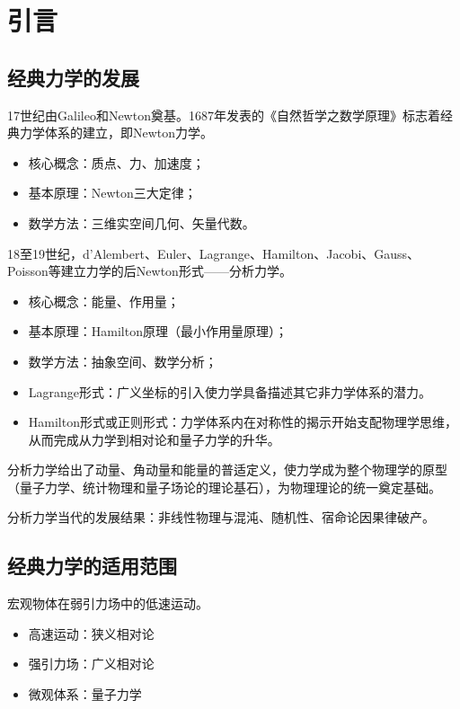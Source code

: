 
\setcounter{chapter}{-1}
\chapter{引言}

\section{经典力学的发展}

17世纪由Galileo和Newton奠基。1687年发表的《自然哲学之数学原理》标志着经典力学体系的建立，即Newton力学。
\begin{itemize}
    \item {\heiti 核心概念}：质点、力、加速度；
    \item {\heiti 基本原理}：Newton三大定律；
    \item {\heiti 数学方法}：三维实空间几何、矢量代数。
\end{itemize}

18至19世纪，d'Alembert、Euler、Lagrange、Hamilton、Jacobi、Gauss、Poisson等建立力学的后Newton形式——分析力学。
\begin{itemize}
    \item {\heiti 核心概念}：能量、作用量；
    \item {\heiti 基本原理}：Hamilton原理（最小作用量原理）；
    \item {\heiti 数学方法}：抽象空间、数学分析；
    \item {\heiti Lagrange形式}：广义坐标的引入使力学具备描述其它非力学体系的潜力。
    \item {\heiti Hamilton形式或正则形式}：力学体系内在对称性的揭示开始支配物理学思维，从而完成从力学到相对论和量子力学的升华。
\end{itemize}

分析力学给出了动量、角动量和能量的普适定义，使力学成为整个物理学的原型（量子力学、统计物理和量子场论的理论基石），为物理理论的统一奠定基础。

分析力学当代的发展结果：非线性物理与混沌、随机性、宿命论因果律破产。

\section{经典力学的适用范围}

{\heiti 宏观物体}在{\heiti 弱引力场}中的{\heiti 低速}运动。

\begin{itemize}
    \item {\heiti 高速运动}：狭义相对论
    \item {\heiti 强引力场}：广义相对论
    \item {\heiti 微观体系}：量子力学
\end{itemize}

